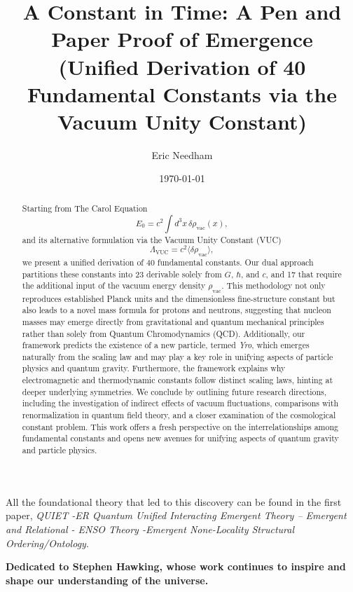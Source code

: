 \documentclass[12pt]{article}
\title{\textbf{A Constant in Time: A Pen and Paper Proof of Emergence}\\
\large (Unified Derivation of 40 Fundamental Constants via the Vacuum Unity Constant)}
\author{Eric Needham}
\date{\today}
\begin{document}
\maketitle

\noindent All the foundational theory that led to this discovery can be found in the first paper, \emph{QUIET -ER Quantum Unified Interacting Emergent Theory – Emergent and Relational - ENSO Theory -Emergent None-Locality Structural Ordering/Ontology}.

\noindent\textbf{Dedicated to Stephen Hawking, whose work continues to inspire and shape our understanding of the universe.}

\begin{abstract}
Starting from The Carol Equation
\[
E_0 = c^2 \int d^3x\, \delta \rho_{\text{vac}}(x),
\]
and its alternative formulation via the Vacuum Unity Constant (VUC)
\[
\Lambda_{\text{VUC}} = c^2 \langle \delta \rho_{\text{vac}} \rangle,
\]
we present a unified derivation of 40 fundamental constants. Our dual approach partitions these constants into 23 derivable solely from \(G\), \(\hbar\), and \(c\), and 17 that require the additional input of the vacuum energy density \(\rho_{\text{vac}}\). This methodology not only reproduces established Planck units and the dimensionless fine-structure constant but also leads to a novel mass formula for protons and neutrons, suggesting that nucleon masses may emerge directly from gravitational and quantum mechanical principles rather than solely from Quantum Chromodynamics (QCD). Additionally, our framework predicts the existence of a new particle, termed \emph{Yro}, which emerges naturally from the scaling law and may play a key role in unifying aspects of particle physics and quantum gravity. Furthermore, the framework explains why electromagnetic and thermodynamic constants follow distinct scaling laws, hinting at deeper underlying symmetries. We conclude by outlining future research directions, including the investigation of indirect effects of vacuum fluctuations, comparisons with renormalization in quantum field theory, and a closer examination of the cosmological constant problem. This work offers a fresh perspective on the interrelationships among fundamental constants and opens new avenues for unifying aspects of quantum gravity and particle physics.
\end{abstract}

\tableofcontents
\newpage
\end{document}
